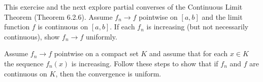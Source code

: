 \begin{solution}
  \TODO
\end{solution}
\begin{exercise}
  This exercise and the next explore partial converses of the Continuous Limit Theorem (Theorem 6.2.6). Assume $f_{n} \rightarrow f$ pointwise on $[a, b]$ and the limit function $f$ is continuous on $[a, b]$. If each $f_{n}$ is increasing (but not necessarily continuous), show $f_{n} \rightarrow f$ uniformly.


\end{exercise}
\begin{solution}
  \TODO
\end{solution}
\begin{exercise}
  Assume $f_{n} \rightarrow f$ pointwise on a compact set $K$ and assume that for each $x \in K$ the sequence $f_{n}(x)$ is increasing. Follow these steps to show that if $f_{n}$ and $f$ are continuous on $K$, then the convergence is uniform.
\end{exercise}
\begin{solution}
  \TODO
\end{solution}
